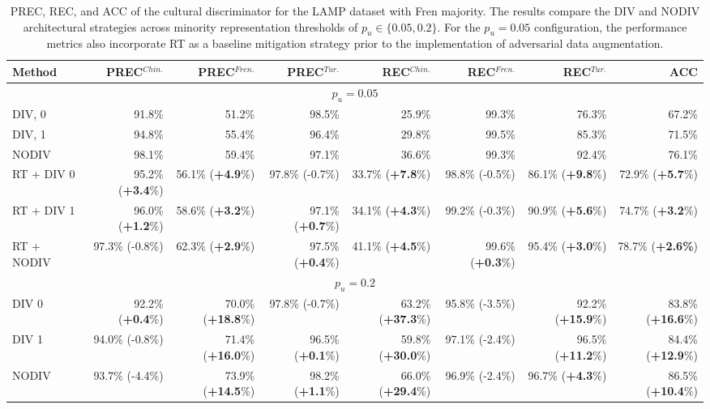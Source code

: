 %
%
\begin{table}
\centering
\scriptsize
\setlength{\tabcolsep}{0.1cm}
\begin{tabular}{lrrrrrrr}
\toprule
\textbf{Method} & \textbf{PREC}$^{Chin.}$  & \textbf{PREC}$^{Fren.}$ & \textbf{PREC}$^{Tur.}$ & \textbf{REC}$^{Chin.}$ & \textbf{REC}$^{Fren.}$ & \textbf{REC}$^{Tur.}$ &  \textbf{ACC}\\
\midrule
\multicolumn{8}{c}{$p_u=0.05$} \\
\midrule
DIV, 0 & 91.8\%&	51.2\%&	98.5\%&	25.9\%&	99.3\%	&	76.3\%&	67.2\%	\\
DIV, 1 & 94.8\%	&	55.4\%&	96.4\%&	29.8\%&	99.5\%&	85.3\%&	71.5\%\\
NODIV & 98.1\%&	59.4\%&	97.1\%&	36.6\%&	99.3\%&	92.4\%	&	76.1\%\\
\midrule
RT + DIV 0      & 95.2\% (\textbf{+3.4}\%) & 56.1\% (\textbf{+4.9}\%) & 97.8\% (-0.7\%) & 33.7\% (\textbf{+7.8}\%) & 98.8\% (-0.5\%) & 86.1\% (\textbf{+9.8}\%) & 72.9\% (\textbf{+5.7}\%) \\
RT + DIV 1      & 96.0\% (\textbf{+1.2}\%) & 58.6\% (\textbf{+3.2}\%) & 97.1\% (\textbf{+0.7}\%) & 34.1\% (\textbf{+4.3}\%) & 99.2\% (-0.3\%) & 90.9\% (\textbf{+5.6}\%) & 74.7\% (\textbf{+3.2}\%) \\
RT + NODIV      & 97.3\% (-0.8\%) & 62.3\% (\textbf{+2.9}\%) & 97.5\% (\textbf{+0.4}\%) & 41.1\% (\textbf{+4.5}\%) & 99.6\% (\textbf{+0.3}\%) & 95.4\% (\textbf{+3.0}\%) & 78.7\% (\textbf{+2.6\%}) \\
\midrule
\multicolumn{8}{c}{$p_u=0.2$} \\
\midrule
DIV 0           & 92.2\% (\textbf{+0.4}\%) & 70.0\% (\textbf{+18.8}\%) & 97.8\% (-0.7\%) & 63.2\% (\textbf{+37.3}\%) & 95.8\% (-3.5\%) & 92.2\% (\textbf{+15.9}\%) & 83.8\% (\textbf{+16.6}\%) \\
DIV 1           & 94.0\% (-0.8\%) & 71.4\% (\textbf{+16.0}\%) & 96.5\% (\textbf{+0.1}\%) & 59.8\% (\textbf{+30.0}\%) & 97.1\% (-2.4\%) & 96.5\% (\textbf{+11.2}\%) & 84.4\% (\textbf{+12.9}\%) \\
NODIV           & 93.7\% (-4.4\%) & 73.9\% (\textbf{+14.5}\%) & 98.2\% (\textbf{+1.1}\%) & 66.0\% (\textbf{+29.4}\%) & 96.9\% (-2.4\%) & 96.7\% (\textbf{+4.3}\%) & 86.5\% (\textbf{+10.4}\%) \\
\bottomrule
\end{tabular}
\caption{PREC, REC, and ACC of the cultural discriminator for the LAMP dataset with Fren majority. The results compare the DIV and NODIV architectural strategies across minority representation thresholds of $p_u \in \{0.05, 0.2\}$. For the $p_u = 0.05$ configuration, the performance metrics also incorporate RT as a baseline mitigation strategy prior to the implementation of adversarial data augmentation.}
\label{ch3:tab:discr:LF}
\end{table}
